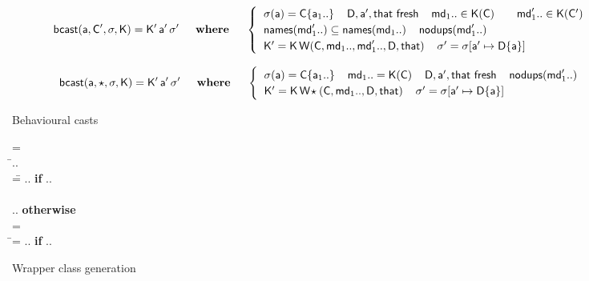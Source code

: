 \documentclass[acmlarge, anonymous, authordraft, review]{acmart} %
\begin{document}
\begin{figure}[!b]
\hrulefill
\small

\vspace{-4mm}

\begin{equation*}
  \behcastE\a\Cp\s\K \Kp\ap\sp \HS\HS\WHERE\HS\HS \begin{cases}
\HS  \App\s\a = \obj\C{\a[1]..} \HS\HS
  \fresh{\D,\ap,\that} \HS\HS
  \md[1].. \In \App\K\C \qquad \mdp[1].. \In \App\K\Cp \\\HS
  \names{\mdp[1]..} \subseteq \names{\md[1]..} \HS\HS \cload{\mdp[1]..} \\\HS
  \Kp = \K\,\wrap\C{\md[1]..}{\mdp[1]..}\D\that \HS\HS
  \sp = \Map \s{\Bind\ap{\obj\D{\a}}} 
  \end{cases}
\end{equation*}

\begin{equation*}
  \behcastE\a\any\s\K \Kp\ap\sp  \HS\HS\WHERE\HS\HS\begin{cases}\HS
  \App\s\a = \obj\C{\a[1]..} \HS\HS \md[1].. = \App\K\C \HS\HS
  \fresh{\D,\ap,\that} \HS\HS \cload{\mdp[1]..} \\\HS
  \Kp = \K\,\wrapAny\C{\md[1]..}\D\that \HS\HS
  \sp = \Map \s{\Bind\ap{\obj\D{\a}}} 
\end{cases}\end{equation*}


\hrulefill
\vspace{-2mm}\caption{Behavioural casts}\label{behavetext}

\hrulefill
\small

\begin{tabbing}\small
  \wrap{}\D\that = \\
  \HS\HS\WHERE\HS\= \Mdef\m\x{\t[1]}{\t[2]}\e\In\md[1].. \\
                 \> \mdpp[1] =\= \src{\Mdef\m\x{\tp[1]}{\tp[2]}{~\BehCast{\tp[2]}{\KCall{\FRead\that}\m{\bscast{\tp[1]}\x}{\t[1]}{\t[2]}}}} ..
    \HS \= \textbf{if} \HS \Mdef\m\x{\tp[1]}{\tp[2]}\ep\In\mdp[1].. \\
\\[-3mm]
\> \>  \src{\Mdef\m\x{\t[1]}{\t[2]}{~\KCall{\FRead\that}\m{\x}{\t[1]}{\t[2]}}} ..  \>\textbf{otherwise}
\\[3mm]
   = \\
\HS\HS\WHERE\HS\=\mdp[1] = \src{ \Mdef\m\x{\any}{\any}{~\BehCast\any{ \KCall{\FRead\that} \m {\bscast{\t}\x}{\t}{\tp}} } }   ..
    \HS\HS\HS\HS \= \textbf{if} \HS \Mdef\m\x{\t}{\tp}\e\In\md[1].. \\
\end{tabbing}

\vspace{-5mm}

\hrulefill
\vspace{-2mm}
\caption{Wrapper class generation}\label{w}\end{figure}
\end{document}
